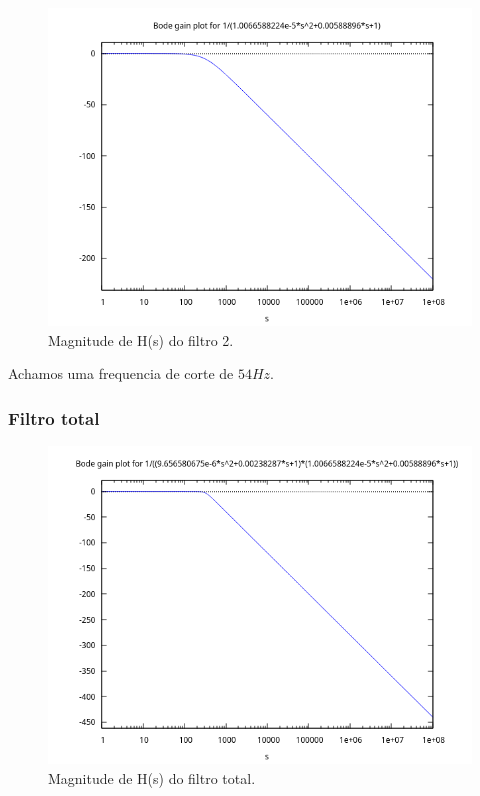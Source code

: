 \documentclass[12pt,twoside, a4paper, twocolumn]{article}
\begin{document}
\begin{figure}[h]
    \centering
    \includegraphics[width=1\columnwidth]{images/bodegainH2.png}
    \caption{Magnitude de H(s) do filtro 2.}
\end{figure}

Achamos uma frequencia de corte de $54Hz$.

\subsubsection{Filtro total}

\begin{figure}[h]
    \centering
    \includegraphics[width=1\columnwidth]{images/bodegainHtotal.png}
    \caption{Magnitude de H(s) do filtro total.}
\end{figure}
\end{document}
